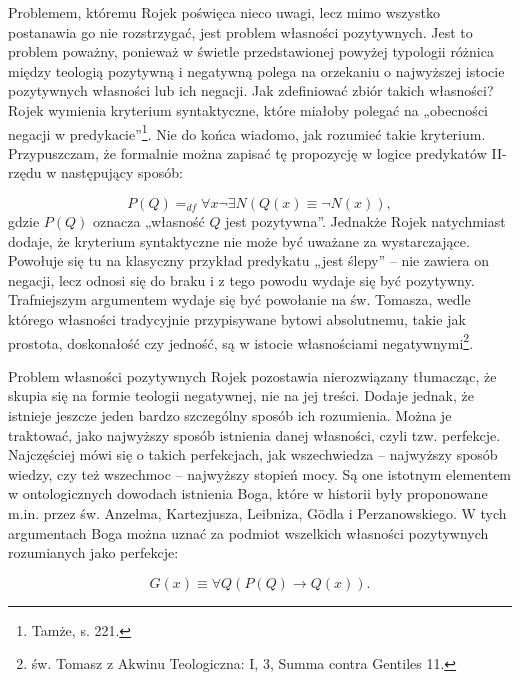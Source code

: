 Problemem, któremu Rojek poświęca nieco uwagi, lecz mimo wszystko
postanawia go nie rozstrzygać, jest problem własności pozytywnych. Jest
to problem poważny, ponieważ w świetle przedstawionej powyżej typologii
różnica między teologią pozytywną i negatywną polega na orzekaniu o
najwyższej istocie pozytywnych własności lub ich negacji. Jak
zdefiniować zbiór takich własności? Rojek wymienia kryterium
syntaktyczne, które miałoby polegać na „obecności negacji w
predykacie”\footnote{Tamże, s. 221. }. Nie do końca wiadomo, jak
rozumieć takie kryterium. Przypuszczam, że formalnie można zapisać tę
propozycję w logice predykatów II-rzędu w następujący sposób:

\begin{equation}
    P(Q) {=}_{df} \forall x \neg \exists N (Q(x) \equiv \neg N(x)),
\end{equation}
gdzie $P(Q)$ oznacza „własność $Q$ jest pozytywna”. Jednakże Rojek
natychmiast dodaje, że kryterium syntaktyczne nie może być uważane za
wystarczające. Powołuje się tu na klasyczny przykład predykatu „jest
ślepy” -- nie zawiera on negacji, lecz odnosi się do braku i z tego
powodu wydaje się być pozytywny. Trafniejszym argumentem wydaje się być
powołanie na św. Tomasza, wedle którego własności tradycyjnie
przypisywane bytowi absolutnemu, takie jak prostota, doskonałość czy
jedność, są w istocie własnościami negatywnymi\footnote{św. Tomasz z
Akwinu Teologiczna: I, 3, Summa contra Gentiles 11. }.

Problem własności pozytywnych Rojek pozostawia nierozwiązany tłumacząc,
że skupia się na formie teologii negatywnej, nie na jej treści. Dodaje
jednak, że istnieje jeszcze jeden bardzo szczególny sposób ich
rozumienia. Można je traktować, jako najwyższy sposób istnienia danej
własności, czyli tzw. perfekcje. Najczęściej mówi się o takich
perfekcjach, jak wszechwiedza -- najwyższy sposób wiedzy, czy też
wszechmoc -- najwyższy stopień mocy. Są one istotnym elementem w
ontologicznych dowodach istnienia Boga, które w historii były
proponowane m.in. przez św. Anzelma, Kartezjusza, Leibniza, Gödla i
Perzanowskiego. W tych argumentach Boga można uznać za podmiot
wszelkich własności pozytywnych rozumianych jako perfekcje:

\begin{equation}
    G(x) \equiv \forall Q (P(Q) \to Q(x)).
\end{equation}


